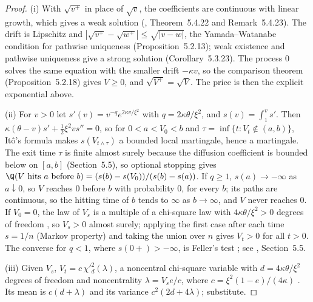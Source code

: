 \begin{proof}
(i) With $\sqrt{v^+}$ in place of $\sqrt v$, the coefficients are continuous with linear growth, which gives a
weak solution (\textcite{karatzas-shreve}, Theorem~5.4.22 and Remark~5.4.23). The drift is Lipschitz and
$|\sqrt{v^+}-\sqrt{w^+}|\le\sqrt{|v-w|}$, the Yamada--Watanabe condition for pathwise uniqueness
(Proposition~5.2.13); weak existence and pathwise uniqueness give a strong solution (Corollary~5.3.23). The
process $0$ solves the same equation with the smaller drift $-\kappa v$, so the comparison theorem
(Proposition~5.2.18) gives $V\ge0$, and $\sqrt{V^+}=\sqrt V$. The price is then the explicit exponential above.

(ii) For $v>0$ let $s'(v)=v^{-q}e^{2\kappa v/\xi^2}$ with $q=2\kappa\theta/\xi^2$, and $s(v)=\int_1^vs'$. Then
$\kappa(\theta-v)s'+\frac12\xi^2vs''=0$, so for $0<a<V_0<b$ and $\tau=\inf\{t:V_t\notin(a,b)\}$, It\^o's formula
makes $s(V_{t\wedge\tau})$ a bounded local martingale, hence a martingale. The exit time $\tau$ is finite
almost surely because the diffusion coefficient is bounded below on $[a,b]$ (Section~5.5), so optional
stopping gives $\Q(V\text{ hits }a\text{ before }b)=(s(b)-s(V_0))/(s(b)-s(a))$. If $q\ge1$, $s(a)\to-\infty$ as
$a\downarrow0$, so $V$ reaches $0$ before $b$ with probability $0$, for every $b$; its paths are continuous, so the
hitting time of $b$ tends to $\infty$ as $b\to\infty$, and $V$ never reaches $0$. If $V_0=0$, the law of $V_s$ is a multiple of a chi-square law with $4\kappa\theta/\xi^2>0$
degrees of freedom \citep[Section~3.4.1]{glasserman-mc}, so $V_s>0$ almost surely; applying the first case
after each time $s=1/n$ (Markov property) and taking the union over $n$ gives $V_t>0$ for all $t>0$. The
converse for $q<1$, where $s(0+)>-\infty$, is Feller's test \citep{feller-1951}; see
\textcite{karatzas-shreve}, Section~5.5.

(iii) Given $V_s$, $V_t=c\,\chi'^2_d(\lambda)$, a noncentral chi-square variable with $d=4\kappa\theta/\xi^2$
degrees of freedom and noncentrality $\lambda=V_se/c$, where $c=\xi^2(1-e)/(4\kappa)$
\citep[Section~3.4.1]{glasserman-mc}. Its mean is $c(d+\lambda)$ and its variance $c^2(2d+4\lambda)$; substitute.


\end{proof}
